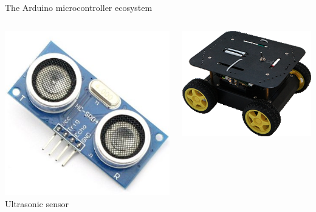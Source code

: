 \documentclass[compress]{beamer}
\begin{document}
\begin{frame}{The Arduino microcontroller ecosystem}
    \begin{columns}
        \begin{column}{0.25\linewidth}
            \begin{center}
                \includegraphics[width=0.9\linewidth]{us-sensor}\\
                Ultrasonic sensor
            \end{center}
        \end{column}
        \begin{column}{0.25\linewidth}
            \begin{center}
                \includegraphics[width=0.9\linewidth]{robot-car}\\

\end{center}
\end{column}
\end{columns}
\end{frame}
\end{document}
